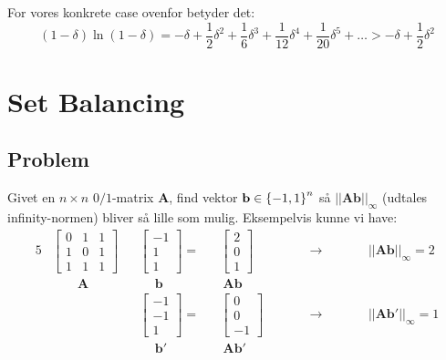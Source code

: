 For vores konkrete case ovenfor betyder det:
$$
(1 - \delta) \ln(1 - \delta)
= - \delta + \frac{1}{2} \delta^2 + \frac{1}{6} \delta^3 + \frac{1}{12} \delta^4 + \frac{1}{20} \delta^5 + \dots > - \delta + \frac{1}{2} \delta^2
$$






\section{Set Balancing}
\subsection{Problem}

Givet en $n \times n$ $0/1$-matrix $\mathbf A$, find vektor $\mathbf b \in \left\{ -1, 1 \right\}^n$ så $||\mathbf{Ab}||_\infty$ (udtales infinity-normen) bliver så lille som mulig. Eksempelvis kunne vi have:
\begin{alignat*}{5}
  &\begin{bmatrix}
  0 & 1 & 1\\
  1 & 0 & 1\\
  1 & 1 & 1
  \end{bmatrix}
  &&\begin{bmatrix}
  -1\\
  1\\
  1
  \end{bmatrix}
  =
  &&\begin{bmatrix}
  2\\
  0\\
  1
  \end{bmatrix}
  \quad\quad &&\rightarrow \quad\quad
  &&||\mathbf{Ab}||_\infty = 2\\
  &\quad\quad \mathbf A
  &&\quad \ \mathbf b
  && \ \mathbf{Ab}\\
  &
  &&\begin{bmatrix}
  -1\\
  -1\\
  1
  \end{bmatrix}
  =
  &&\begin{bmatrix}
  0\\
  0\\
  -1
  \end{bmatrix}
  \quad\quad &&\rightarrow \quad\quad
  &&||\mathbf{Ab'}||_\infty = 1\\
  &
  &&\quad \ \mathbf b'
  && \ \mathbf{Ab'}\\
\end{alignat*}

